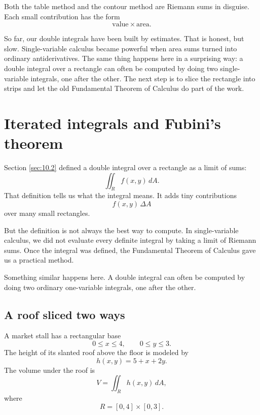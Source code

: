 Both the table method and the contour method are Riemann sums in disguise.  Each
small contribution has the form
\[
    \text{value}\times\text{area}.
\]

So far, our double integrals have been built by estimates.  That is honest, but slow.
Single-variable calculus became powerful when area sums turned into ordinary
antiderivatives.  The same thing happens here in a surprising way: a double integral
over a rectangle can often be computed by doing two single-variable integrals, one
after the other.  The next step is to slice the rectangle into strips and let the old
Fundamental Theorem of Calculus do part of the work.

\section{Iterated integrals and Fubini's theorem}
\label{sec:10.3}

Section \ref{sec:10.2} defined a double integral over a rectangle as a limit of sums:
\[
    \iint_R f(x,y)\,dA.
\]
That definition tells us what the integral means.  It adds tiny contributions
\[
    f(x,y)\,\Delta A
\]
over many small rectangles.

But the definition is not always the best way to compute.  In single-variable calculus,
we did not evaluate every definite integral by taking a limit of Riemann sums.  Once the
integral was defined, the Fundamental Theorem of Calculus gave us a practical method.

Something similar happens here.  A double integral can often be computed by doing two
ordinary one-variable integrals, one after the other.

\subsection{A roof sliced two ways}

A market stall has a rectangular base
\[
    0\le x\le 4,
    \qquad
    0\le y\le 3.
\]
The height of its slanted roof above the floor is modeled by
\[
    h(x,y)=5+x+2y.
\]
The volume under the roof is
\[
    V=\iint_R h(x,y)\,dA,
\]
where
\[
    R=[0,4]\times[0,3].
\]

